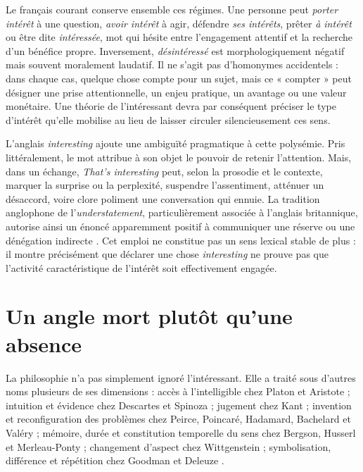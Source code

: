 \documentclass[11pt,a4paper]{article}
\begin{document}
Le français courant conserve ensemble ces régimes. Une personne peut
\emph{porter intérêt} à une question, \emph{avoir intérêt} à agir, défendre
\emph{ses intérêts}, prêter \emph{à intérêt} ou être dite \emph{intéressée},
mot qui hésite entre l'engagement attentif et la recherche d'un bénéfice propre.
Inversement, \emph{désintéressé} est morphologiquement négatif mais souvent
moralement laudatif. Il ne s'agit pas d'homonymes accidentels : dans chaque cas,
quelque chose compte pour un sujet, mais ce « compter » peut désigner une prise
attentionnelle, un enjeu pratique, un avantage ou une valeur monétaire. Une
théorie de l'intéressant devra par conséquent préciser le type d'intérêt qu'elle
mobilise au lieu de laisser circuler silencieusement ces sens.

L'anglais \emph{interesting} ajoute une ambiguïté pragmatique à cette polysémie.
Pris littéralement, le mot attribue à son objet le pouvoir de retenir
l'attention. Mais, dans un échange, \emph{That's interesting} peut, selon la
prosodie et le contexte, marquer la surprise ou la perplexité, suspendre
l'assentiment, atténuer un désaccord, voire clore poliment une conversation qui
ennuie. La tradition anglophone de l'\emph{understatement}, particulièrement
associée à l'anglais britannique, autorise ainsi un énoncé apparemment positif
à communiquer une réserve ou une dénégation indirecte
\parencite[29--30]{wierzbicka2006english}. Cet emploi ne constitue pas un sens
lexical stable de plus : il montre précisément que déclarer une chose
\emph{interesting} ne prouve pas que l'activité caractéristique de l'intérêt
soit effectivement engagée.

\section{Un angle mort plutôt qu'une absence}

La philosophie n'a pas simplement ignoré l'intéressant. Elle a traité sous
d'autres noms plusieurs de ses dimensions : accès à l'intelligible chez Platon
et Aristote
\parencite{platon2016republique,platon1995theetete,aristote1991metaphysique,aristote2005seconds};
intuition et évidence chez Descartes et Spinoza
\parencite{descartes2002regles,descartes1992meditations,spinoza1966ethique};
jugement chez Kant \parencite{kant2001raison,kant1993juger}; invention et
reconfiguration des problèmes chez Peirce, Poincaré, Hadamard, Bachelard et
Valéry
\parencite{peirce1955writings,poincare1908science,hadamard1959invention,bachelard1999formation,valery1973cahiers};
mémoire, durée et constitution temporelle du sens chez Bergson, Husserl et
Merleau-Ponty
\parencite{bergson2013evolution,bergson2013pensee,husserl1970experience,husserl1957logique,merleau1945phenomenologie};
changement d'aspect chez Wittgenstein \parencite{wittgenstein2004recherches};
symbolisation, différence et répétition chez Goodman et Deleuze
\parencite{goodman1976languages,deleuze1968difference}.
\end{document}
